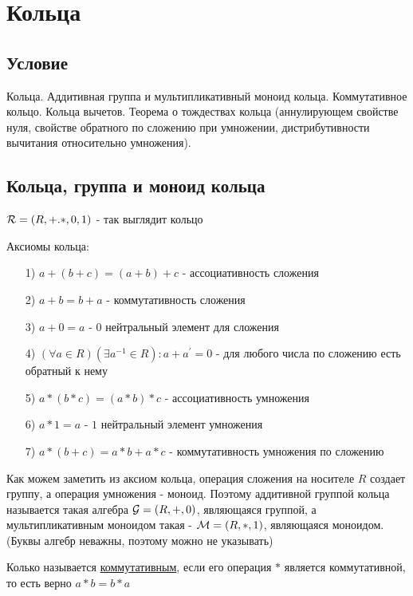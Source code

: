 \documentclass{report}
\begin{document}
\section{Кольца}
\subsection{Условие}
Кольца. Аддитивная группа и мультипликативный моноид кольца. Коммутативное
кольцо. Кольца вычетов. Теорема о тождествах кольца (аннулирующем свойстве нуля,
свойстве обратного по сложению при умножении, дистрибутивности вычитания
относительно умножения).

\subsection{Кольца, группа и моноид кольца}
${\cal R} = (R, +. *, 0, 1)$ - так выглядит кольцо

\medskip

Аксиомы кольца:
\begin{itemize}
	\item[1)] $a + (b + c) = (a + b) + c$ - ассоциативность сложения
	\item[2)] $a + b = b + a$ - коммутативность сложения
	\item[3)] $a + 0 = a$ - $0$ нейтральный элемент для сложения
	\item[4)] $(\forall a \in R)(\exists a^{-1} \in R): a + a^{\prime} = 0$ - для любого числа по сложению есть обратный к нему
	\item[5)] $a * (b * c) = (a * b) * c$ - ассоциативность умножения
	\item[6)] $a * 1 = a$ - $1$ нейтральный элемент умножения
	\item[7)] $a*(b+c) = a*b + a*c$ - коммутативность умножения по сложению
\end{itemize}

\medskip

Как можем заметить из аксиом кольца, операция сложения на носителе $R$ создает группу,
а операция умножения - моноид. Поэтому аддитивной группой кольца называется такая алгебра
${\cal G} = (R, +, 0)$, являющаяся группой, а мультипликативным моноидом такая -
${\cal M} = (R, *, 1)$, являющаяся моноидом. (Буквы алгебр неважны, поэтому можно не указывать)

\medskip

Колько называется \underline{коммутативным}, если его операция $*$ является
коммутативной, то есть верно $a * b = b * a$
\end{document}

